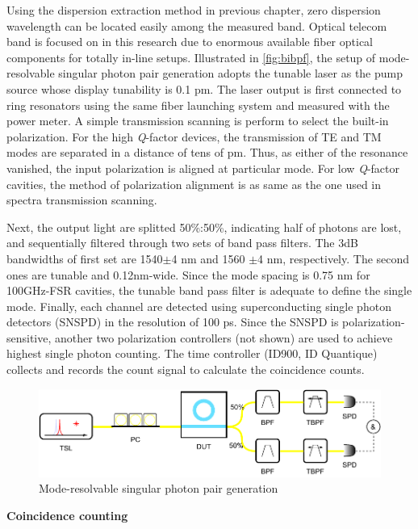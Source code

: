 Using the dispersion extraction method in previous chapter, zero dispersion wavelength can be located easily among the measured band. Optical telecom band is focused on in this research due to enormous available fiber optical components for totally in-line setups. 
Illustrated in \autoref{fig:bibpf}, the setup of mode-resolvable singular photon pair generation adopts the tunable laser as the pump source whose display tunability is 0.1 pm. The laser output is first connected to ring resonators using the same fiber launching system and measured with the power meter. A simple transmission scanning is perform to select the built-in polarization. For the high \textit{Q}-factor devices, the transmission of TE and TM modes are separated in a distance of tens of pm. Thus, as either of the resonance vanished, the input polarization is aligned at particular mode. For low \textit{Q}-factor cavities, the method of polarization alignment is as same as the one used in spectra transmission scanning.

Next, the output light are splitted 50\si{\percent}:50\si{\percent}, indicating half of photons are lost, and sequentially filtered through two sets of band pass filters. The 3dB bandwidths of first set are 1540$\pm$4 nm and 1560 $\pm$4 nm, respectively. The second ones are tunable and 0.12nm-wide. Since the mode spacing is 0.75 nm for 100GHz-FSR cavities, the tunable band pass filter is adequate to define the single mode. Finally, each channel are detected using superconducting single photon detectors (SNSPD) in the resolution of 100 ps. Since the SNSPD is polarization-sensitive, another two polarization controllers (not shown) are used to achieve highest single photon counting. The time controller (ID900, ID Quantique) collects and records the count signal to calculate the coincidence counts.

\begin{figure}
	\centering
	\includegraphics[width=1\linewidth]{imgs/biBPF.pdf}
%	
	\caption{Mode-resolvable singular photon pair generation}
	\label{fig:bibpf}
\end{figure}

\bigskip
\noindent\textbf{Coincidence counting}

